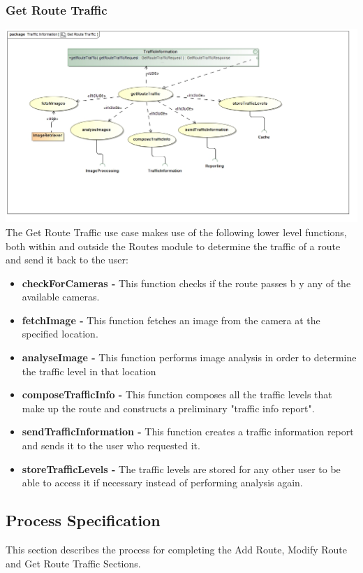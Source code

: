 \documentclass[a4paper,12pt]{article}
\begin{document}
\subsubsection{Get Route Traffic}
\includegraphics[width=\textwidth]{images/Get_Route_Traffic.jpg}
The Get Route Traffic use case makes use of the following lower level functions, both within and outside the Routes module to determine the traffic of a route and send it back to the user:
\begin{itemize}
\item \textbf{checkForCameras -} This function checks if the route passes b y any of the available cameras.
\item \textbf{fetchImage -} This function fetches an image from the camera at the specified location.
\item \textbf{analyseImage -} This function performs image analysis in order to determine the traffic level in that location
\item \textbf{composeTrafficInfo -} This function composes all the traffic levels that make up the route and constructs a preliminary "traffic info report".
\item \textbf{sendTrafficInformation -} This function creates a traffic information report and sends it to the user who requested it.
\item \textbf{storeTrafficLevels -} The traffic levels are stored for any other user to be able to access it if necessary instead of performing analysis again.
\end{itemize}

\subsection{Process Specification}
This section describes the process for completing the Add Route, Modify Route and Get Route Traffic Sections.
\end{document}
